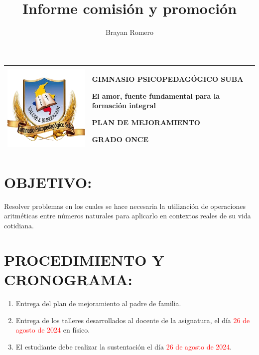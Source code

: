 \documentclass[spanish,12pt,a4paper]{article}
\title{Informe comisión y promoción}
\author{Brayan Romero}
\begin{document}
	
	\begin{center}
		\begin{tabular}{|p{3cm}|p{12cm}|}
			\hline
			\vspace{0.05cm}
			\centering
			\includegraphics[scale=0.35]{logo.png}
			&
			\begin{center}
				\textbf{GIMNASIO PSICOPEDAGÓGICO SUBA}
				
				\vspace{0.1cm}
				El amor, fuente fundamental para la formación integral
				
				\vspace{0.1cm}
				\textbf{PLAN DE MEJORAMIENTO}
				
				\vspace{0.1cm}
				\textbf{GRADO ONCE}
				
			\end{center}
			\\
			\hline
			
			
		\end{tabular}
		
	\end{center}	
	
	\section*{OBJETIVO:}
	Resolver problemas en los cuales se hace necesaria la utilización de operaciones aritméticas entre números naturales para aplicarlo en contextos reales de su vida cotidiana. 
	
	\section*{PROCEDIMIENTO Y CRONOGRAMA:}
	\begin{enumerate}
		\item Entrega del plan de mejoramiento al padre de familia.
		\item Entrega de los talleres desarrollados al docente de la asignatura, el día \textcolor{red}{26 de agosto de 2024} en físico.
		\item El estudiante debe realizar la sustentación el día \textcolor{red}{26 de agosto de 2024}.
	\end{enumerate}
	
\end{document}
